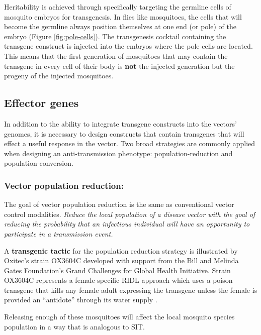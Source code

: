 Heritability is achieved through specifically targeting the \gls{germline} cells of mosquito embryos for transgenesis.
In flies like mosquitoes, the cells that will become the germline always position themselves at one end (or pole) of the embryo (Figure \ref{fig:pole-cells}).
The transgenesis cocktail containing the transgene construct is injected into the embryos where the pole cells are located.
This means that the first generation of mosquitoes that may contain the transgene in every cell of their body is \textbf{not} the injected generation but the progeny of the injected mosquitoes.



\subsection{Effector genes}

In addition to the ability to integrate transgene constructs into the vectors' genomes, it is necessary to design constructs that contain transgenes that will effect a useful response in the vector.
Two broad strategies are commonly applied when designing an anti-transmission phenotype: \gls{population-reduction} and \gls{population-conversion}.

\subsubsection{Vector population reduction:}

The goal of vector population reduction is the same as conventional vector control modalities.
\emph{Reduce the local population of a disease vector with the goal of reducing the probability that an infectious individual will have an opportunity to participate in a transmission event.}


A \textbf{transgenic tactic} for the population reduction strategy is illustrated by Oxitec's \Aa strain OX3604C developed with support from the Bill and Melinda Gates Foundation's Grand Challenges for Global Health Initiative.
Strain OX3604C represents a female-specific \gls{RIDL} approach which uses a poison transgene that kills any female adult expressing the transgene unless the female is provided an ``antidote'' through its water supply \cite{WisedeValdez2011,Bargielowski2012,Facchinelli2013}.

Releasing enough of these mosquitoes will affect the local mosquito species population in a way that is analogous to \gls{SIT}.

